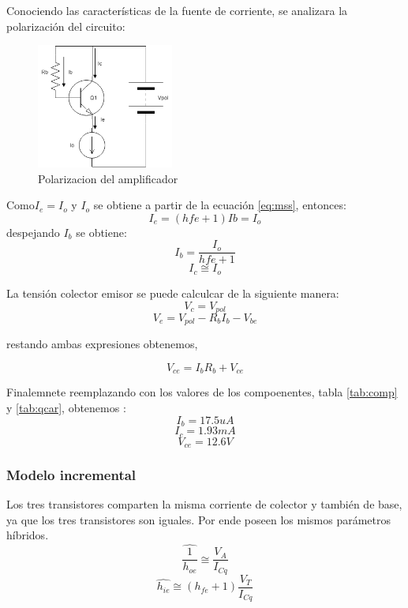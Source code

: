 \documentclass[../../main.tex]{subfiles}
\begin{document}
Conociendo las características de la fuente de corriente, se analizara la polarización del circuito:

\begin{figure}[H]	
	\centering
	\includegraphics[width=0.4\textwidth]{imagenes/pol.png}
	\caption{Polarizacion del amplificador}
\end{figure}

Como$ I_e=I_o $ y $ I_o $ se obtiene a partir de la ecuación \ref{eq:mss}, entonces:
\begin{equation}
I_e=\left( hfe +1 \right)  Ib=I_o
\end{equation}
despejando $I_b$ se obtiene:
\begin{equation}
I_b=\frac{I_o}{hfe+1}
\end{equation}
\begin{equation}
I_{c}\cong I_o
\end{equation}

La tensión colector emisor se puede calculcar de la siguiente manera:
\begin{equation}
V_c=V_{pol}
\end{equation}
\begin{equation}
V_e=V_{pol} - R_b I_b - V_{be}
\end{equation}

restando ambas expresiones obtenemos,

\begin{equation}
V_{ce}=I_b R_b + V_{ce}
\end{equation}

Finalemnete reemplazando con los valores de los compoenentes, tabla \ref{tab:comp} y \ref{tab:qcar}, obtenemos :
$$I_b=17.5uA $$
$$I_c=1.93 mA $$
$$V_{ce}=12.6V $$

\subsubsection{Modelo incremental}
Los tres transistores comparten la misma corriente de colector y también de base, ya que los tres transistores son iguales. Por ende poseen los  mismos parámetros híbridos.
$$\widehat{\frac{1}{h_{oe}}}\cong \frac{V_A}{I_{Cq}} $$
$$ \widehat{h_{ie}}\cong (h_{fe}+1)\frac{V_T}{I_{Cq}}$$
\end{document}
